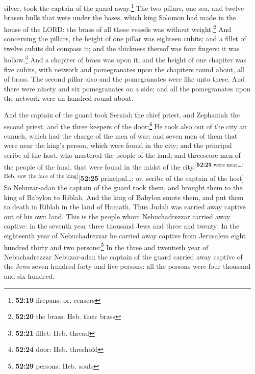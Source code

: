 silver, took the captain of the guard away.\footnote{\textbf{52:19}
  firepans: or, censers}  The two pillars, one sea, and
twelve brasen bulls that were under the bases, which king Solomon had
made in the house of the LORD: the brass of all these vessels was
without weight.\footnote{\textbf{52:20} the brass: Heb. their brass}
 And concerning the pillars, the height of one pillar was
eighteen cubits; and a fillet of twelve cubits did compass it; and the
thickness thereof was four fingers: it was hollow.\footnote{\textbf{52:21}
  fillet: Heb. thread}  And a chapiter of brass was upon
it; and the height of one chapiter was five cubits, with network and
pomegranates upon the chapiters round about, all of brass. The second
pillar also and the pomegranates were like unto these. 
And there were ninety and six pomegranates on a side; and all the
pomegranates upon the network were an hundred round about.

 And the captain of the guard took Seraiah the chief
priest, and Zephaniah the second priest, and the three keepers of the
door:\footnote{\textbf{52:24} door: Heb. threshold}  He
took also out of the city an eunuch, which had the charge of the men of
war; and seven men of them that were near the king's person, which were
found in the city; and the principal scribe of the host, who mustered
the people of the land; and threescore men of the people of the land,
that were found in the midst of the
city.\textsuperscript{{[}\textbf{52:25} were near\ldots: Heb. saw the
face of the king{]}}{[}\textbf{52:25} principal\ldots: or, scribe of the
captain of the host{]}  So Nebuzar-adan the captain of
the guard took them, and brought them to the king of Babylon to Riblah.
 And the king of Babylon smote them, and put them to
death in Riblah in the land of Hamath. Thus Judah was carried away
captive out of his own land.  This is the people whom
Nebuchadrezzar carried away captive: in the seventh year three thousand
Jews and three and twenty:  In the eighteenth year of
Nebuchadrezzar he carried away captive from Jerusalem eight hundred
thirty and two persons:\footnote{\textbf{52:29} persons: Heb. souls}
 In the three and twentieth year of Nebuchadrezzar
Nebuzar-adan the captain of the guard carried away captive of the Jews
seven hundred forty and five persons: all the persons were four thousand
and six hundred.

